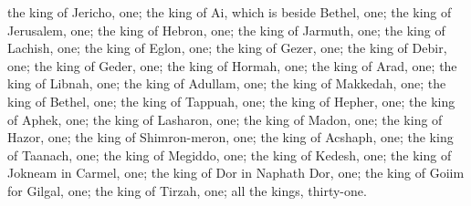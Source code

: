 \begin{biblechapter}
\verse the king of Jericho, one; the king of Ai, which is beside Bethel, one;
\verse the king of Jerusalem, one; the king of Hebron, one;
\verse the king of Jarmuth, one; the king of Lachish, one;
\verse the king of Eglon, one; the king of Gezer, one;
\verse the king of Debir, one; the king of Geder, one;
\verse the king of Hormah, one; the king of Arad, one;
\verse the king of Libnah, one; the king of Adullam, one;
\verse the king of Makkedah, one; the king of Bethel, one;
\verse the king of Tappuah, one; the king of Hepher, one;
\verse the king of Aphek, one; the king of Lasharon, one;
\verse the king of Madon, one; the king of Hazor, one;
\verse the king of Shimron-meron, one; the king of Acshaph, one;
\verse the king of Taanach, one; the king of Megiddo, one;
\verse the king of Kedesh, one; the king of Jokneam in Carmel, one;
\verse the king of Dor in Naphath Dor, one; the king of Goiim for Gilgal, one;
\verse the king of Tirzah, one; all the kings, thirty-one.
\end{biblechapter}

